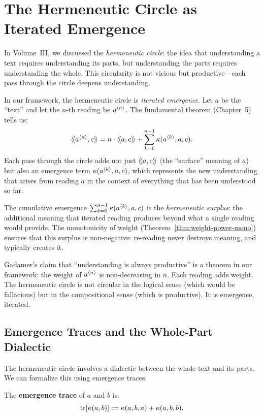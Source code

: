 \section{The Hermeneutic Circle as Iterated Emergence}

In Volume~III, we discussed the \emph{hermeneutic circle}: the idea that
understanding a text requires understanding its parts, but understanding the
parts requires understanding the whole. This circularity is not vicious but
productive---each pass through the circle deepens understanding.

In our framework, the hermeneutic circle is \emph{iterated emergence}. Let
$a$ be the ``text'' and let the $n$-th reading be $a^{\langle n \rangle}$. The
fundamental theorem (Chapter~5) tells us:
\[
  \langle\!\langle a^{\langle n \rangle}, c \rangle\!\rangle = n \cdot \langle\!\langle a, c \rangle\!\rangle + \sum_{k=0}^{n-1} \kappa(a^{\langle k \rangle}, a, c).
\]
Each pass through the circle adds not just $\langle\!\langle a, c \rangle\!\rangle$ (the ``surface'' meaning
of $a$) but also an emergence term $\kappa(a^{\langle k \rangle}, a, c)$, which represents
the new understanding that arises from reading $a$ in the context of everything
that has been understood so far.

\begin{interpretation}
The cumulative emergence $\sum_{k=0}^{n-1} \kappa(a^{\langle k \rangle}, a, c)$ is
the \emph{hermeneutic surplus}: the additional meaning that iterated reading
produces beyond what a single reading would provide. The monotonicity of weight
(Theorem~\ref{thm:weight-power-mono}) ensures that this surplus is non-negative:
re-reading never destroys meaning, and typically creates it.

Gadamer's claim that ``understanding is always productive'' is a theorem in
our framework: the weight of $a^{\langle n \rangle}$ is non-decreasing in $n$. Each
reading adds weight. The hermeneutic circle is not circular in the logical
sense (which would be fallacious) but in the compositional sense (which is
productive). It is emergence, iterated.
\end{interpretation}

\subsection{Emergence Traces and the Whole-Part Dialectic}

The hermeneutic circle involves a dialectic between the whole text and its parts.
We can formalize this using emergence traces:

\begin{definition}
\label{def:emergence-trace}
The \textbf{emergence trace} of $a$ and $b$ is:
\[
  \mathrm{tr}[\kappa(a,b)] := \kappa(a, b, a) + \kappa(a, b, b).
\]
\end{definition}

